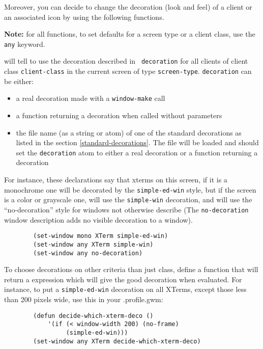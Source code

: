 Moreover, you can decide to change the decoration (look and feel)
of a client or an associated icon by using the following functions.

{\bf Note:} for all functions, to set defaults for a screen type or a client
class, use the \verb"any" keyword.

\begin{description}

\label{set-window} will tell {\GWM} to use the decoration described in {\tt
decoration} for all clients of client class {\tt client-class} in the
current screen of type \verb"screen-type". {\tt decoration} can be either:

\begin{itemize} 
\item a real decoration made with a {\tt window-make} call
\item a function returning a decoration when called without parameters 
\item the file name (as a string or atom) of one of the standard decorations 
as listed in the section \ref{standard-decorations}. The file will be loaded
and should set the {\tt decoration} atom to either a real decoration or a
function returning a decoration 
\end{itemize}

For instance, these declarations say that xterms on this screen, if it is a
monochrome one will be decorated by the \verb"simple-ed-win" style, but if
the screen is a color or grayscale one, will use the \verb"simple-win"
decoration, and will use the ``no-decoration'' style for windows not otherwise
describe (The {\tt no-decoration} window description adds no visible
decoration to a window).

{\exemplefont\begin{verbatim}
        (set-window mono XTerm simple-ed-win)
        (set-window any XTerm simple-win)
        (set-window any no-decoration)
\end{verbatim}}

To choose decorations on other criteria than just class, define a function
that will return a {\WOOL} expression which will give the good decoration when
evaluated. For instance, to put a \verb"simple-ed-win" decoration on all
XTerms, except those less than 200 pixels wide, use this in your .profile.gwm:

{\exemplefont\begin{verbatim}
        (defun decide-which-xterm-deco ()
            '(if (< window-width 200) (no-frame)
                 (simple-ed-win)))
        (set-window any XTerm decide-which-xterm-deco)
\end{verbatim}}


\end{description}
